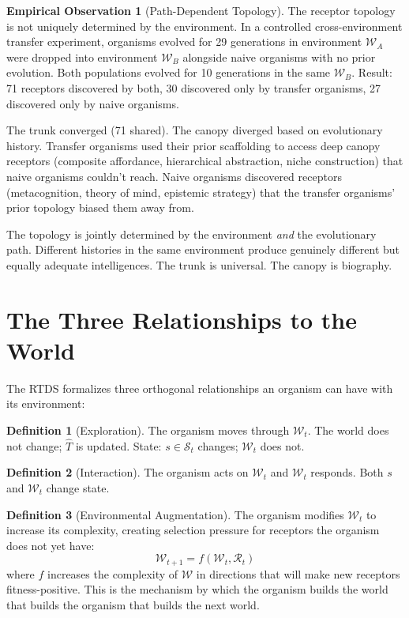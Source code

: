 \documentclass[12pt]{article}
\theoremstyle{definition}
\newtheorem{definition}{Definition}
\newtheorem{observation}{Empirical Observation}
\begin{document}
\begin{observation}[Path-Dependent Topology]
The receptor topology is not uniquely determined by the environment. In a controlled
cross-environment transfer experiment, organisms evolved for 29 generations in
environment $\mathcal{W}_A$ were dropped into environment $\mathcal{W}_B$ alongside
naive organisms with no prior evolution. Both populations evolved for 10 generations
in the same $\mathcal{W}_B$. Result: 71 receptors discovered by both, 30 discovered
only by transfer organisms, 27 discovered only by naive organisms.

The trunk converged (71 shared). The canopy diverged based on evolutionary history.
Transfer organisms used their prior scaffolding to access deep canopy receptors
(composite affordance, hierarchical abstraction, niche construction) that naive
organisms couldn't reach. Naive organisms discovered receptors (metacognition,
theory of mind, epistemic strategy) that the transfer organisms' prior topology
biased them away from.

The topology is jointly determined by the environment \emph{and} the evolutionary
path. Different histories in the same environment produce genuinely different
but equally adequate intelligences. The trunk is universal. The canopy is biography.
\end{observation}

\section{The Three Relationships to the World}

The RTDS formalizes three orthogonal relationships an organism can have with its environment:

\begin{definition}[Exploration]
The organism moves through $\mathcal{W}_t$. The world does not change; $\hat{T}$ is
updated. State: $s \in \mathcal{S}_t$ changes; $\mathcal{W}_t$ does not.
\end{definition}

\begin{definition}[Interaction]
The organism acts on $\mathcal{W}_t$ and $\mathcal{W}_t$ responds. Both $s$ and
$\mathcal{W}_t$ change state.
\end{definition}

\begin{definition}[Environmental Augmentation]
The organism modifies $\mathcal{W}_t$ to increase its complexity, creating selection
pressure for receptors the organism does not yet have:
\[
\mathcal{W}_{t+1} = f(\mathcal{W}_t, \mathcal{R}_t)
\]
where $f$ increases the complexity of $\mathcal{W}$ in directions that will make new
receptors fitness-positive. This is the mechanism by which the organism builds the world
that builds the organism that builds the next world.
\end{definition}
\end{document}
